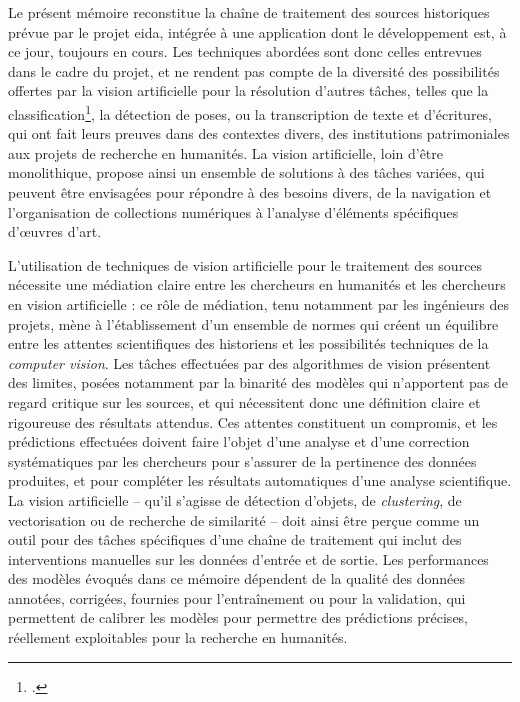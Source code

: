\documentclass[a4paper,12pt,twoside]{book}
\newcommand{\cv}{\textit{computer vision}\xspace}
\newcommand{\eida}{\gls{eida}\xspace}
\begin{document}
	Le présent mémoire reconstitue la chaîne de traitement des sources historiques prévue par le projet \eida, intégrée à une application dont le développement est, à ce jour, toujours en cours. Les techniques abordées sont donc celles entrevues dans le cadre du projet, et ne rendent pas compte de la diversité des possibilités offertes par la vision artificielle pour la résolution d'autres tâches, telles que la classification\footcite{shenLargeScaleHistoricalWatermark2019}, la détection de poses, ou la transcription de texte et d'écritures, qui ont fait leurs preuves dans des contextes divers, des institutions patrimoniales aux projets de recherche en humanités. La vision artificielle, loin d'être monolithique, propose ainsi un ensemble de solutions à des tâches variées, qui peuvent être envisagées pour répondre à des besoins divers, de la navigation et l'organisation de collections numériques à l'analyse d'éléments spécifiques d'œuvres d'art.
	
	L'utilisation de techniques de vision artificielle pour le traitement des sources nécessite une médiation claire entre les chercheurs en humanités et les chercheurs en vision artificielle : ce rôle de médiation, tenu notamment par les ingénieurs des projets, mène à l'établissement d'un ensemble de normes qui créent un équilibre entre les attentes scientifiques des historiens et les possibilités techniques de la \cv. Les tâches effectuées par des algorithmes de vision présentent des limites, posées notamment par la binarité des modèles qui n'apportent pas de regard critique sur les sources, et qui nécessitent donc une définition claire et rigoureuse des résultats attendus. Ces attentes constituent un compromis, et les prédictions effectuées doivent faire l'objet d'une analyse et d'une correction systématiques par les chercheurs pour s'assurer de la pertinence des données produites, et pour compléter les résultats automatiques d'une analyse scientifique. La vision artificielle -- qu'il s'agisse de détection d'objets, de \textit{clustering}, de vectorisation ou de recherche de similarité -- doit ainsi être perçue comme un outil pour des tâches spécifiques d'une chaîne de traitement qui inclut des interventions manuelles sur les données d'entrée et de sortie. Les performances des modèles évoqués dans ce mémoire dépendent de la qualité des données annotées, corrigées, fournies pour l'entraînement ou pour la validation, qui permettent de calibrer les modèles pour permettre des prédictions précises, réellement exploitables pour la recherche en humanités.
	
\end{document}
